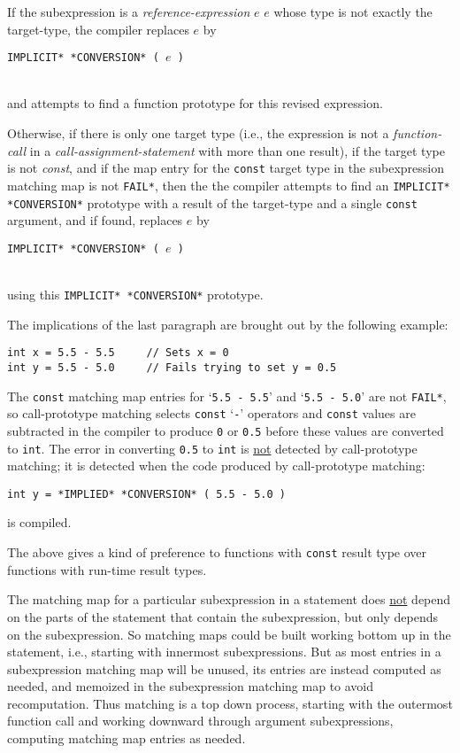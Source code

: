 \documentclass[12pt]{article}
\newenvironment{indpar}[1][0.3in]%
	{\begin{list}{}%
		     {\setlength{\itemsep}{0in}%
		      \setlength{\topsep}{0in}%
		      \setlength{\parsep}{1ex}%
		      \setlength{\labelwidth}{#1}%
		      \setlength{\leftmargin}{#1}%
		      \addtolength{\leftmargin}{\labelsep}}%
	 \item}%
	{\end{list}}
\begin{document}
If the subexpression is a {\em reference-expression} $e$
$e$ whose type is not exactly the target-type, the compiler replaces $e$ by \\
\centerline{\tt *IMPLICIT* *CONVERSION* ( $e$ )} \\[0.5ex]
and attempts to find a function prototype for this revised expression.

Otherwise, if there is only one target type (i.e., the expression is not
a {\em function-call} in a {\em call-assignment-statement} with more than
one result), if the target type is not {\em const},
and if the map entry for the {\tt const} target type in the subexpression
matching map is not {\tt *FAIL*}, then the
the compiler attempts to find an {\tt *IMPLICIT* *CONVER\-SION*} prototype
with a result of the target-type and a single {\tt const} argument, and
if found, replaces $e$ by \\
\centerline{\tt *IMPLICIT* *CONVERSION* ( $e$ )} \\[0.5ex]
using this {\tt *IMPLICIT* *CONVERSION*} prototype.

The implications of the last paragraph are brought out by the following
example:
\begin{indpar}\begin{verbatim}
int x = 5.5 - 5.5     // Sets x = 0
int y = 5.5 - 5.0     // Fails trying to set y = 0.5
\end{verbatim}\end{indpar}
The {\tt const} matching map entries for `{\tt 5.5 - 5.5}' and
`{\tt 5.5 - 5.0}' are not {\tt *FAIL*}, so call-prototype matching
selects {\tt const} `{\tt -}' operators and {\tt const} values are
subtracted in the compiler to produce {\tt 0} or {\tt 0.5} before
these values are converted to {\tt int}.  The error in converting
{\tt 0.5} to {\tt int} is \underline{not} detected by call-prototype
matching; it is detected when the code produced by call-prototype
matching: \\
\centerline{\tt int y = *IMPLIED* *CONVERSION* ( 5.5 - 5.0 )}
is compiled.

The above gives a kind of preference to functions with {\tt const}
result type over functions with run-time result types.

The matching map for a particular subexpression in a statement does
\underline{not} depend on the parts of the statement that contain
the subexpression, but only depends on the subexpression.
So matching maps could be built working bottom up in the
statement, i.e., starting with innermost subexpressions.  But
as most entries in a subexpression matching map will be unused, its entries
are instead computed as needed, and memoized in the subexpression
matching map to avoid recomputation.  Thus matching is a top down
process, starting with the outermost function call and working
downward through argument subexpressions, computing matching map
entries as needed.
\end{document}
